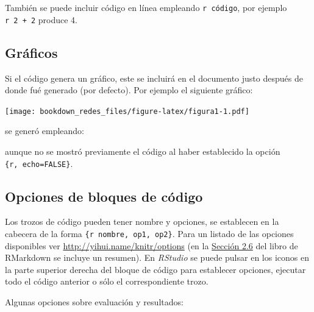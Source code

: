 \documentclass[
]{book}
\newenvironment{Shaded}{\begin{snugshade}}{\end{snugshade}}
\newcommand{\InformationTok}[1]{\textcolor[rgb]{0.56,0.35,0.01}{\textbf{\textit{#1}}}}
\theoremstyle{definition}
\theoremstyle{definition}
\theoremstyle{definition}
\theoremstyle{definition}
\theoremstyle{remark}
\begin{document}
También se puede incluir código en línea empleando \texttt{\textasciigrave{}r\ código\textasciigrave{}},
por ejemplo \texttt{\textasciigrave{}r\ 2\ +\ 2\textasciigrave{}} produce 4.

\hypertarget{gruxe1ficos}{%
\subsection{Gráficos}\label{gruxe1ficos}}

Si el código genera un gráfico, este se incluirá en el documento justo después de donde fué generado
(por defecto). Por ejemplo el siguiente gráfico:

\texttt{[image: bookdown\_redes\_files/figure-latex/figura1-1.pdf]}

se generó empleando:

\begin{Shaded}
\end{Shaded}

aunque no se mostró previamente el código al haber establecido la opción \texttt{\textasciigrave{}\textasciigrave{}\textasciigrave{}\{r,\ echo=FALSE\}}.

\hypertarget{opcodigo}{%
\subsection{Opciones de bloques de código}\label{opcodigo}}

Los trozos de código pueden tener nombre y opciones, se establecen en la cabecera de la forma
\texttt{\textasciigrave{}\textasciigrave{}\textasciigrave{}\{r\ nombre,\ op1,\ op2\}}.
Para un listado de las opciones disponibles ver \url{http://yihui.name/knitr/options}
(en la \href{https://bookdown.org/yihui/rmarkdown/r-code.html}{Sección 2.6} del libro de RMarkdown
se incluye un resumen).
En \emph{RStudio} se puede pulsar en los iconos en la parte superior derecha del bloque de código
para establecer opciones, ejecutar todo el código anterior o sólo el correspondiente trozo.

Algunas opciones sobre evaluación y resultados:
\end{document}
